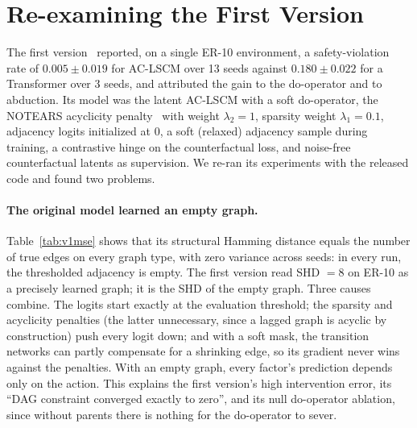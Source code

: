 \section{Re-examining the First Version}
\label{sec:v1}

The first version~\citep{madapathi2026zenodo} reported, on a single ER-10
environment, a safety-violation rate of $0.005 \pm 0.019$ for AC-LSCM over 13
seeds against $0.180 \pm 0.022$ for a Transformer over 3 seeds, and
attributed the gain to the do-operator and to abduction. Its model was the
latent AC-LSCM with a soft do-operator, the NOTEARS acyclicity
penalty~\citep{zheng2018notears} with weight $\lambda_2 = 1$, sparsity weight
$\lambda_1 = 0.1$, adjacency logits initialized at $0$, a soft (relaxed)
adjacency sample during training, a contrastive hinge on the counterfactual
loss, and noise-free counterfactual latents as supervision. We re-ran its
experiments with the released code and found two problems.

\paragraph{The original model learned an empty graph.}
Table~\ref{tab:v1mse} shows that its structural Hamming distance equals the
number of true edges on every graph type, with zero variance across seeds: in
every run, the thresholded adjacency is empty. The first version read
SHD $= 8$ on ER-10 as a precisely learned graph; it is the SHD of the empty
graph. Three causes combine. The logits start exactly at the evaluation
threshold; the sparsity and acyclicity penalties (the latter unnecessary,
since a lagged graph is acyclic by construction) push every logit down; and
with a soft mask, the transition networks can partly compensate for a
shrinking edge, so its gradient never wins against the penalties. With an
empty graph, every factor's prediction depends only on the action. This
explains the first version's high intervention error, its ``DAG constraint
converged exactly to zero'', and its null do-operator ablation, since without
parents there is nothing for the do-operator to sever.

\begin{table}[t]
\centering

\caption{The first version's models re-run with the released code (one-step
error on noisy held-out data; 3 to 5 seeds; best in bold). The original
AC-LSCM's SHD equals the number of true edges, with zero variance, on every
graph: it learned an empty graph in every run.}
\label{tab:v1mse}
\end{table}


